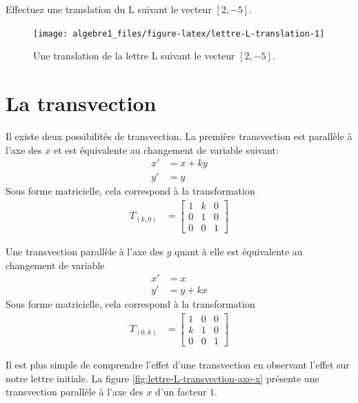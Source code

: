 \documentclass[]{book}
\theoremstyle{definition}
\theoremstyle{definition}
\theoremstyle{definition}
\theoremstyle{remark}
\let\BeginKnitrBlock\begin \let\EndKnitrBlock\end
\begin{document}
\BeginKnitrBlock{example}
\protect\hypertarget{exm:unnamed-chunk-260}{}{\label{exm:unnamed-chunk-260} }Effectuez une translation du L suivant le vecteur \([2,-5]\).
\EndKnitrBlock{example}

\begin{figure}

{\centering \texttt{[image: algebre1\_files/figure-latex/lettre-L-translation-1]} 

}

\caption{Une translation de la lettre L suivant le vecteur $[2,-5]$.}\label{fig:lettre-L-translation}
\end{figure}

\hypertarget{la-transvection}{%
\section{La transvection}\label{la-transvection}}

Il existe deux possibilités de transvection. La première transvection est parallèle à l'axe des \(x\) et est équivalente au changement de variable suivant:
\begin{align*}
    x'&=x+ky \\
    y'&=y
\end{align*}
Sous forme matricielle, cela correspond à la transformation
\begin{align*}
    T_{(k,0)} &= \begin{bmatrix}
        1 & k &0\\
        0 & 1&0\\
        0&0&1
    \end{bmatrix}
\end{align*}

Une transvection parallèle à l'axe des \(y\) quant à elle est équivalente au changement de variable
\begin{align*}
    x'&=x \\
    y'&=y+kx
\end{align*}
Sous forme matricielle, cela correspond à la transformation
\begin{align*}
    T_{(0,k)} &= \begin{bmatrix}
        1 & 0 &0\\
        k & 1 &0\\
        0&0&1
    \end{bmatrix}
\end{align*}

Il est plus simple de comprendre l'effet d'une transvection en observant l'effet sur notre lettre initiale. La figure \ref{fig:lettre-L-transvection-axe-x} présente une transvection parallèle à l'axe des \(x\) d'un facteur \(1\).
\end{document}
